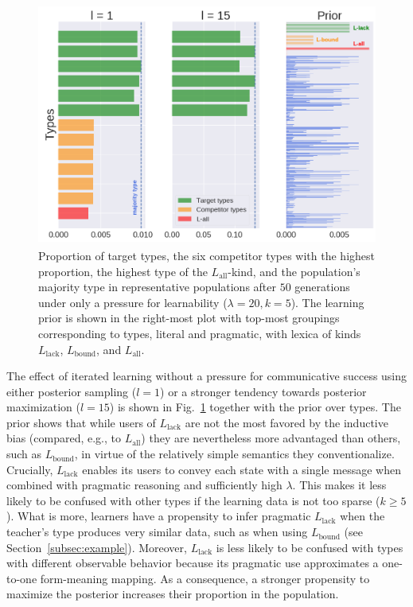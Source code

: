 \documentclass[a4paper, 11pt]{article}
\theoremstyle{Satz}
\newcommand{\mylang}[1]{\ensuremath{L_{\text{#1}}}\xspace} %
\newcommand{\Lall}{\mylang{all}}
\newcommand{\Lbound}{\mylang{bound}}
\newcommand{\Llack}{\mylang{lack}}
\begin{document}
\begin{figure}[t]
\centering
\includegraphics[width=1\textwidth,height=8cm,keepaspectratio]{./plots/barh-onlym}

\caption{Proportion of target types, the six competitor types with the highest proportion, the highest type of the $\Lall$-kind, and the population's majority type in representative populations after $50$ generations under only a
  pressure for learnability ($\lambda = 20, k = 5$). The learning prior is shown in the
  right-most plot with top-most groupings corresponding to types, literal and pragmatic, with
  lexica of kinds $\Llack$, $\Lbound$, and $\Lall$.}
\label{fig:only-M}
\end{figure}

The effect of iterated learning without a pressure for communicative success using either
posterior sampling ($l = 1$) or a stronger tendency towards posterior maximization ($l = 15$)
is shown in Fig.~\ref{fig:only-M} together with the prior over types. The prior shows that
while users of $\Llack$ are not the most favored by the inductive bias (compared, e.g., to
$\Lall$) they are nevertheless more advantaged than others, such as $\Lbound$, in virtue of the
relatively simple semantics they conventionalize. Crucially, $\Llack$ enables its users to
convey each state with a single message when combined with pragmatic reasoning and sufficiently
high $\lambda$. This makes it less likely to be confused with other types if the learning data
is not too sparse ($k \geq 5$). What is more, learners have a propensity to infer pragmatic
$\Llack$ when the teacher's type produces very similar data, such as when using $\Lbound$ (see
Section~\ref{subsec:example}). Moreover, $\Llack$ is less likely to be confused with types with
different observable behavior because its pragmatic use approximates a one-to-one form-meaning
mapping. As a consequence, a stronger propensity to maximize the posterior increases their
proportion in the population.
\end{document}

